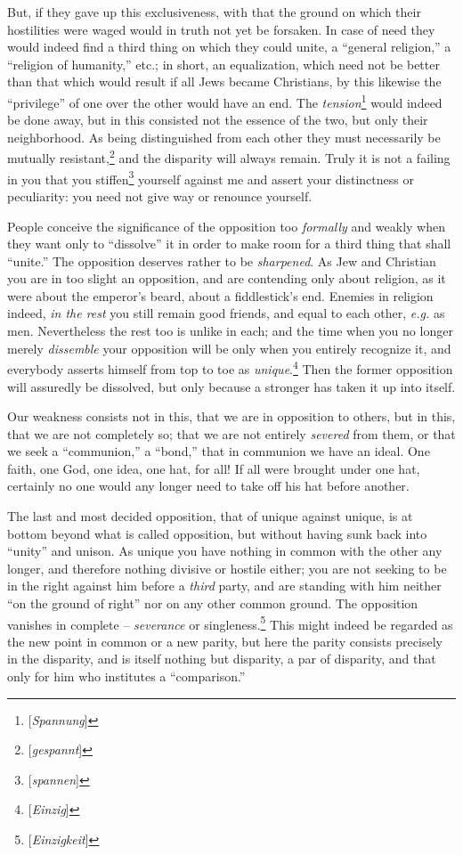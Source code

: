 \documentclass[12pt,a4paper]{book}
\begin{document}
But, if they gave up this exclusiveness, with that the ground on which their 
hostilities were waged would in truth not yet be forsaken. In case of need 
they would indeed find a third thing on which they could unite, a ``general 
religion,'' a ``religion of humanity,'' etc.; in short, an equalization, 
which need not be better than that which would result if all Jews became 
Christians, by this likewise the ``privilege'' of one over the other would 
have an end. The \textit{tension}\footnote{[\textit{Spannung}]} would indeed 
be done away, but in this consisted not the essence of the two, but only their 
neighborhood. As being distinguished from each other they must necessarily be 
mutually resistant,\footnote{[\textit{gespannt}]} and the disparity will 
always remain. Truly it is not a failing in you that you 
stiffen\footnote{[\textit{spannen}]} yourself against me and assert your 
distinctness or peculiarity: you need not give way or renounce yourself.

People conceive the significance of the opposition too \textit{formally} and 
weakly when they want only to ``dissolve'' it in order to make room for a 
third thing that shall ``unite.'' The opposition deserves rather to be 
\textit{sharpened}. As Jew and Christian you are in too slight an opposition, 
and are contending only about religion, as it were about the emperor's beard, 
about a fiddlestick's end. Enemies in religion indeed, \textit{in the rest} 
you still remain good friends, and equal to each other, \textit{e.g.} as men. 
Nevertheless the rest too is unlike in each; and the time when you no longer 
merely \textit{dissemble} your opposition will be only when you entirely 
recognize it, and everybody asserts himself from top to toe as 
\textit{unique}.\footnote{[\textit{Einzig}]} Then the former opposition will 
assuredly be dissolved, but only because a stronger has taken it up into 
itself.

Our weakness consists not in this, that we are in opposition to others, but in 
this, that we are not completely so; that we are not entirely \textit{severed} 
from them, or that we seek a ``communion,'' a ``bond,'' that in communion 
we have an ideal. One faith, one God, one idea, one hat, for all! If all were 
brought under one hat, certainly no one would any longer need to take off his 
hat before another.

The last and most decided opposition, that of unique against unique, is at 
bottom beyond what is called opposition, but without having sunk back into 
``unity'' and unison. As unique you have nothing in common with the other 
any longer, and therefore nothing divisive or hostile either; you are not 
seeking to be in the right against him before a \textit{third} party, and are 
standing with him neither ``on the ground of right'' nor on any other common 
ground. The opposition vanishes in complete -- \textit{severance} or 
singleness.\footnote{[\textit{Einzigkeit}]} This might indeed be regarded as 
the new point in common or a new parity, but here the parity consists 
precisely in the disparity, and is itself nothing but disparity, a par of 
disparity, and that only for him who institutes a ``comparison.''
\end{document}
